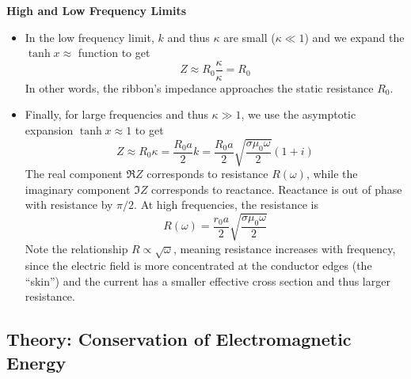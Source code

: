 \documentclass[11pt, a4paper]{article}
\renewcommand{\vec}[1]{\bm{#1}} %
\newcommand{\mm}{\mu_{0}}  %
\newcommand{\m}{\vec{m}}  %
\begin{document}
\textbf{High and Low Frequency Limits}
\begin{itemize}

	\item In the low frequency limit, $ k $ and thus $ \kappa $ are small ($ \kappa \ll 1 $) and we expand the $ \tanh x \approx  $ function to get
	\begin{equation*}
		Z \approx R_{0} \frac{\kappa}{\kappa} = R_{0}
	\end{equation*}
	In other words, the ribbon's impedance approaches the static resistance $ R_{0} $.
	
	\item Finally, for large frequencies and thus $ \kappa \gg 1 $, we use the asymptotic expansion $ \tanh x \approx 1 $ to get
	\begin{equation*}
		Z \approx R_{0}\kappa = \frac{R_{0}a}{2}k = \frac{R_{0}a}{2} \sqrt{\frac{\sigma \mm \omega}{2}}(1 + i)
	\end{equation*}
	The real component $ \Re Z $ corresponds to resistance $ R(\omega) $, while the imaginary component $ \Im Z $ corresponds to reactance. Reactance is out of phase with resistance by $ \pi/2 $. At high frequencies, the resistance is
	\begin{equation*}
		R(\omega) = \frac{r_{0}a}{2}\sqrt{\frac{\sigma \mm \omega}{2}}
	\end{equation*}
	Note the relationship $ R \propto \sqrt{\omega} $, meaning resistance increases with frequency, since the electric field is more concentrated at the conductor edges (the ``skin'') and the current has a smaller effective cross section and thus larger resistance.
	
	
\end{itemize}

\subsection{Theory: Conservation of Electromagnetic Energy}
\end{document}
